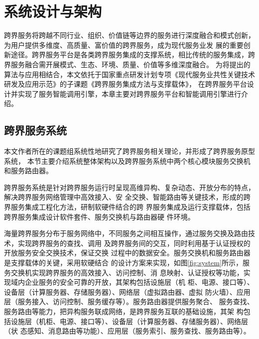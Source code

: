 \chapter{系统设计与架构}
跨界服务将跨越不同行业、组织、价值链等边界的服务进行深度融合和模式创新，为用户提供多维度、高质量、富价值的跨界服务，成为现代服务业发
展的重要创新途径。跨界服务平台是各类跨界服务集成的支撑系统，相比传统的服务集成，跨界服务融合需开展模式、生态、环境、质量、价值等多维深度融合。
为将提出的算法与应用相结合，本文依托于国家重点研发计划专项《现代服务业共性关键技术研发及应用示范》的子课题《跨界服务集成方法与支撑载体》，
在跨界服务平台设计并实现了服务智能调用引擎，本章主要对跨界服务平台和智能调用引擎进行介绍。

\section{跨界服务系统}
本文作者所在的课题组系统性地研究了跨界服务相关理论，并形成了跨界服务原型系统，
本节主要介绍系统整体架构以及跨界服务系统中两个核心模块服务交换机和服务路由器。

  跨界服务系统是针对跨界服务运行时呈现高维异构、复杂动态、开放分布的特点，解决跨界服务网络管理中高效接入、安
  全交换、智能路由等关键技术，形成的跨界服务集成工程化方法，研制软硬件结合的跨
  界服务集成及运行支撑载体，包括跨界服务集成设计软件套件、服务交换机与路由器硬
  件环境。

  海量跨界服务分布于服务网络中，不同服务之间相互操作，通过服务交换及路由技术，实现跨界服务的查找、调用
  及跨界服务间的交互，同时利用基于认证授权的开放服务安全交换技术，保证交换
  过程中的数据安全。服务交换机和服务路由器是支撑载体的关键，采用软硬结合
  的设计方案来实现，如图\ref{fig:system}所示，服务交换机实现跨界服务的高效接入、访问控制、消
  息映射、认证授权等功能，实现域内企业服务的安全可靠的开放，其架构包括设施层（机
  柜、电源、接口等）、设备层（计算服务器、存储服务器）、网络层（虚拟路由器、虚拟
  防火墙）、应用层（服务接入、访问控制、服务缓存等）。服务路由器提供服务聚合、
  服务查找、服务路由等能力，把异构服务联成网络，是跨界服务互联的基础设施，其架
  构包括设施层（机柜、电源、接口等）、设备层（计算服务器、存储服务器）、网络层（状
  态感知、消息路由等功能）、应用层（服务索引、服务查找、服务路由等）。

